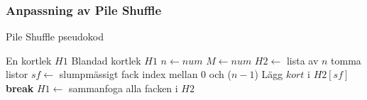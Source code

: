 \documentclass[swedish,a4paper]{article}
\begin{document}
\clearpage %


\subsubsection{Anpassning av Pile Shuffle}

\begin{algorithm}
\caption{Pile Shuffle pseudokod}
\label{alg:pile}
\begin{algorithmic}[1]
\Require En kortlek $H1$
\Ensure Blandad kortlek $H1$ 
\State $n \gets num$ 
\State $M \gets num $ 
\State $H2 \gets$ lista av $n$ tomma listor %
    \Loop
        \State $sf \gets$ slumpmässigt fack index mellan $0$ och ($n-1$) 
            \State Lägg $kort$ i $H2[sf]$
            \State \textbf{break}
        \EndIf
    \EndLoop
\EndFor
\State $H1 \gets$ sammanfoga alla facken i $H2$ 
\end{algorithmic}
\end{algorithm}
\end{document}
